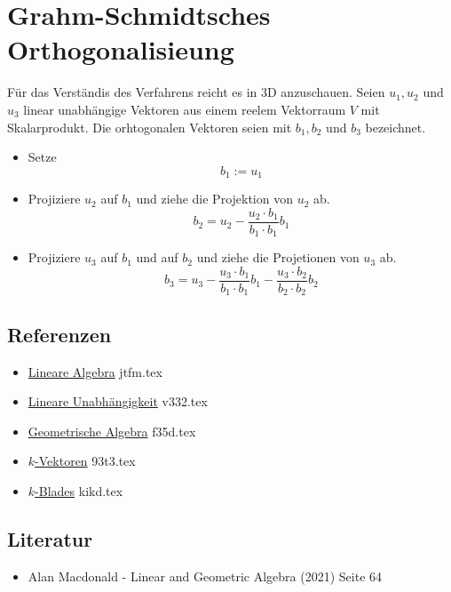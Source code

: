 \documentclass{sajzk}
\begin{document}
\section{Grahm-Schmidtsches Orthogonalisieung}
\label{zju4}
Für das Verständis des Verfahrens reicht es in 3D anzuschauen. Seien $u_1, u_2$
und $u_3$ linear unabhängige Vektoren aus einem reelem Vektorraum $V$ mit
Skalarprodukt. Die orhtogonalen Vektoren seien mit $b_1, b_2$ und $b_3$
bezeichnet.
\begin{itemize}
  \item  Setze
    \[b_1 := u_1\]
  \item Projiziere $u_2$ auf $b_1$ und ziehe die Projektion von $u_2$ ab.
    \[b_2=u_2 - \frac{u_2\cdot b_1}{b_1\cdot b_1}b_1\]
  \item  Projiziere $u_3$ auf $b_1$ und auf $b_2$ und ziehe die Projetionen von $u_3$
  ab.
  \[b_3=u_3 - \frac{u_3\cdot b_1}{b_1\cdot b_1}b_1 - \frac{u_3\cdot b_2}{b_2\cdot b_2}b_2\]
\end{itemize}

\subsection{Referenzen}
\begin{itemize}
    \item \href{jtfm.pdf}{Lineare Algebra} jtfm.tex
    \item \href{v332.pdf}{Lineare Unabhängigkeit} v332.tex
    \item \href{f35d.pdf}{Geometrische Algebra} f35d.tex
    \item \href{93t3.pdf}{$k$-Vektoren} 93t3.tex
    \item \href{kikd.pdf}{$k$-Blades} kikd.tex
\end{itemize}

\subsection{Literatur}
\begin{itemize}
    \item Alan Macdonald - Linear and Geometric Algebra (2021) Seite 64
\end{itemize}
\end{document}
